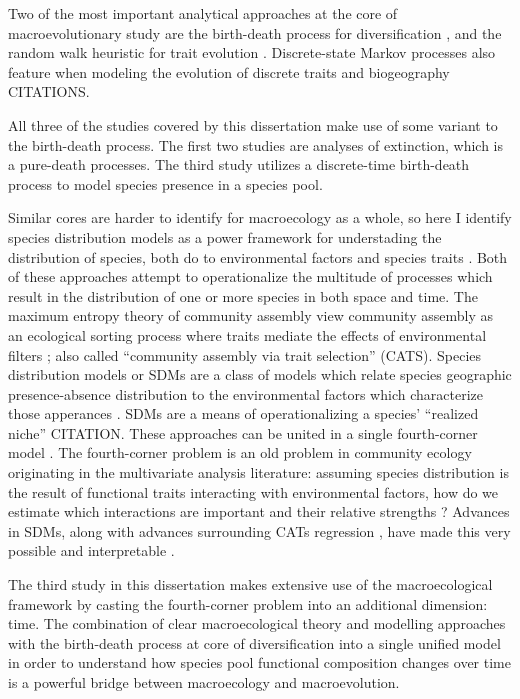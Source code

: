 Two of the most important analytical approaches at the core of macroevolutionary study are the birth-death process for diversification \citep{Raup1973,Raup1985,Nee1992,Nee1994a,Nee2001,Nee2006b,Stadler2013b}, and the random walk heuristic for trait evolution \citep{Raup1974a,Felsenstein1985b,Bookstein1987b,Gingerich1993,Roopnarine2001a,Roopnarine2003b,Roopnarine1999,Sheets2001,Hunt2006a,Hunt2007a}. Discrete-state Markov processes also feature when modeling the evolution of discrete traits and biogeography CITATIONS.

All three of the studies covered by this dissertation make use of some variant to the birth-death process. The first two studies are analyses of extinction, which is a pure-death processes. The third study utilizes a discrete-time birth-death process to model species presence in a species pool.

Similar cores are harder to identify for macroecology as a whole, so here I identify species distribution models as a power framework for understading the distribution of species, both do to environmental factors \citep{Elith2009} and species traits \citep{Shipley2006}. Both of these approaches attempt to operationalize the multitude of processes which result in the distribution of one or more species in both space and time. The maximum entropy theory of community assembly view community assembly as an ecological sorting process where traits mediate the effects of environmental filters \citep{Shipley2006,Warton2015a}; also called ``community assembly via trait selection'' (CATS). Species distribution models or SDMs are a class of models which relate species geographic presence-absence distribution to the environmental factors which characterize those apperances \citep{Elith2009,Austin2006,Phillips2006a}. SDMs are a means of operationalizing a species' ``realized niche'' CITATION. These approaches can be united in a single fourth-corner model \citep{Warton2015a,Brown2014c}. The fourth-corner problem is an old problem in community ecology originating in the multivariate analysis literature: assuming species distribution is the result of functional traits interacting with environmental factors, how do we estimate which interactions are important and their relative strengths \citep{Legendre1997,Dray2008}? Advances in SDMs, along with advances surrounding CATs regression \citep{Renner2013}, have made this very possible and interpretable \citep{Brown2014c,Jamil2013,Pollock2012,Pollock2015}.

The third study in this dissertation makes extensive use of the macroecological framework by casting the fourth-corner problem into an additional dimension: time. The combination of clear macroecological theory and modelling approaches with the birth-death process at core of diversification into a single unified model in order to understand how species pool functional composition changes over time is a powerful bridge between macroecology and macroevolution.



